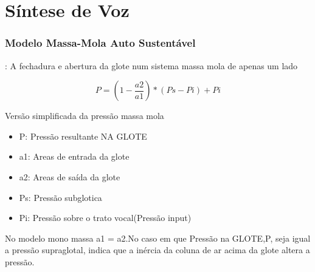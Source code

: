\chapter{Síntese de Voz}

	\subsection{Modelo Massa-Mola Auto Sustentável}:
	A fechadura e abertura da glote num sistema massa mola de apenas um lado

	\[
		P = (1 - \frac{a2}{a1})*(Ps- Pi) + Pi
	\]
		
	
	Versão simplificada da pressão massa mola
	\begin{itemize}
		\item P: Pressão resultante NA GLOTE
		\item a1: Areas de entrada da glote
		\item a2: Areas de saída  da glote
		\item Ps: Pressão subglotica
		\item Pi: Pressão sobre o trato vocal(Pressão input)
	\end{itemize}
	
		No modelo mono massa a1 = a2.No caso em que Pressão na GLOTE,P, seja  igual a pressão  supraglotal, indica que a inércia da coluna de ar acima da glote altera a pressão.
	
	
